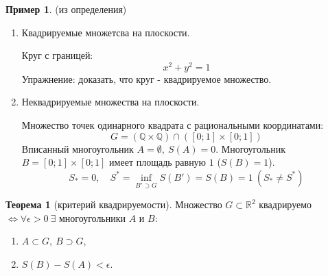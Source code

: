 \documentclass{report}
\theoremstyle{definition}
\newtheorem{example}{Пример}
\newtheorem{theorem}{Теорема}[section]
\begin{document}
\begin{example}
  (из определения)

  \begin{enumerate}
    \item Квадрируемые множетсва на плоскости.

          Круг с границей:
          \begin{equation*}
            x^2 + y^2 = 1
          \end{equation*}
          Упражнение: доказать, что круг - квадрируемое множество.
    \item Неквадрируемые множества на плоскости.

          Множество точек одинарного квадрата с рациональными координатами:
          \begin{equation*}
            G = (\mathbb{Q} \times \mathbb{Q})\cap([0;1] \times [0;1])
          \end{equation*}
          Вписанный многоугольник $A = \emptyset, \ S(A) = 0$. Многоугольник $B = [0;1] \times [0;1]$
          имеет площадь равную  $1$ ($S(B) = 1$).
          \begin{equation*}
            S_* = 0, \quad S^* = \underset{B'\supset G}{\inf}S(B') = S(B) = 1 \ (S_* \ne S^*)
          \end{equation*}
  \end{enumerate}
\end{example}

\begin{theorem}[критерий квадрируемости]
  Множество $G\subset\mathbb{R}^2$ квадрируемо $\iff \forall \epsilon > 0 \ \exists$ многоугольники $A$ и $B$:
  \begin{enumerate}
    \item $A\subset G, \ B \supset G$,
    \item $S(B) - S(A) < \epsilon$.
  \end{enumerate}
\end{theorem}
\end{document}
